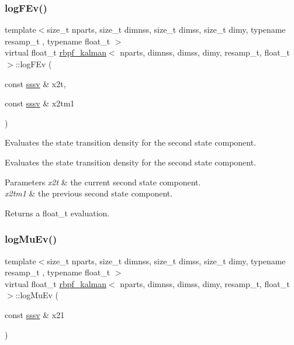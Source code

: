 \subsubsection{\texorpdfstring{log\+F\+Ev()}{logFEv()}}
{\footnotesize\ttfamily template$<$size\+\_\+t nparts, size\+\_\+t dimnss, size\+\_\+t dimss, size\+\_\+t dimy, typename resamp\+\_\+t , typename float\+\_\+t $>$ \\
virtual float\+\_\+t \hyperlink{classrbpf__kalman}{rbpf\+\_\+kalman}$<$ nparts, dimnss, dimss, dimy, resamp\+\_\+t, float\+\_\+t $>$\+::log\+F\+Ev (\begin{DoxyParamCaption}\item[{const \hyperlink{classrbpf__kalman_a616e56c08c1a6b476e065b2200433915}{sssv} \&}]{x2t,  }\item[{const \hyperlink{classrbpf__kalman_a616e56c08c1a6b476e065b2200433915}{sssv} \&}]{x2tm1 }\end{DoxyParamCaption})\hspace{0.3cm}{\ttfamily [pure virtual]}}



Evaluates the state transition density for the second state component. 

Evaluates the state transition density for the second state component. 
\begin{DoxyParams}{Parameters}
{\em x2t} & the current second state component. \\
\hline
{\em x2tm1} & the previous second state component. \\
\hline
\end{DoxyParams}
\begin{DoxyReturn}{Returns}
a float\+\_\+t evaluation. 
\end{DoxyReturn}
\mbox{\label{classrbpf__kalman_a7040efe459b2346aa8c06a3013f3887c}} 
\subsubsection{\texorpdfstring{log\+Mu\+Ev()}{logMuEv()}}
{\footnotesize\ttfamily template$<$size\+\_\+t nparts, size\+\_\+t dimnss, size\+\_\+t dimss, size\+\_\+t dimy, typename resamp\+\_\+t , typename float\+\_\+t $>$ \\
virtual float\+\_\+t \hyperlink{classrbpf__kalman}{rbpf\+\_\+kalman}$<$ nparts, dimnss, dimss, dimy, resamp\+\_\+t, float\+\_\+t $>$\+::log\+Mu\+Ev (\begin{DoxyParamCaption}\item[{const \hyperlink{classrbpf__kalman_a616e56c08c1a6b476e065b2200433915}{sssv} \&}]{x21 }\end{DoxyParamCaption})\hspace{0.3cm}{\ttfamily [pure virtual]}}



